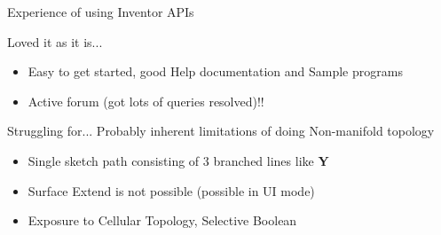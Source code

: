 \begin{frame}{Experience of using Inventor APIs}
\begin{block}{Loved it as it is...}
\begin{itemize}[noitemsep,label=\textbullet,topsep=2pt,parsep=2pt,partopsep=2pt]
\item Easy to get started, good Help documentation and Sample programs
\item Active forum (got lots of queries resolved)!!
\end{itemize}
\end{block}

\begin{block}{Struggling for...}
Probably inherent limitations of doing Non-manifold topology
	\begin{itemize}[noitemsep,label=\textbullet,topsep=2pt,parsep=2pt,partopsep=2pt]
	\item Single sketch path consisting of 3 branched lines like \textbf{Y}
	\item Surface Extend is not possible (possible in UI mode)
	\item Exposure to Cellular Topology, Selective Boolean
	\end{itemize}
\end{block}

\end{frame}

